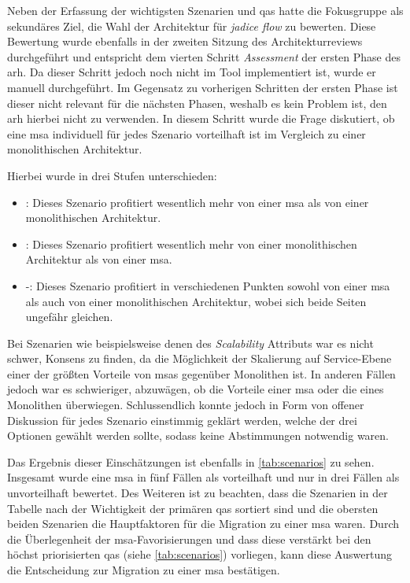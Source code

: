 Neben der Erfassung der wichtigsten Szenarien und \glspl{qa} hatte die Fokusgruppe als sekundäres Ziel, die Wahl der Architektur für \emph{jadice flow} zu bewerten.
Diese Bewertung wurde ebenfalls in der zweiten Sitzung des Architekturreviews durchgeführt und entspricht dem vierten Schritt \emph{Assessment} der ersten Phase des \gls{arh}.
Da dieser Schritt jedoch noch nicht im Tool implementiert ist, wurde er manuell durchgeführt.
Im Gegensatz zu vorherigen Schritten der ersten Phase ist dieser nicht relevant für die nächsten Phasen, weshalb es kein Problem ist, den \gls{arh} hierbei nicht zu verwenden.
In diesem Schritt wurde die Frage diskutiert, ob eine \acrlong{msa} individuell für jedes Szenario vorteilhaft ist im Vergleich zu einer monolithischen Architektur.

\newpage
Hierbei wurde in drei Stufen unterschieden:
\begin{itemize}
	\item \advantage\hspace*{0.1cm}: Dieses Szenario profitiert wesentlich mehr von einer \gls{msa} als von einer monolithischen Architektur.
	\item \disadvantage\hspace*{0.1cm}: Dieses Szenario profitiert wesentlich mehr von einer monolithischen Architektur als von einer \gls{msa}.
	\item \hspace*{0.27cm}-\hspace*{0.27cm}: Dieses Szenario profitiert in verschiedenen Punkten sowohl von einer \gls{msa} als auch von einer monolithischen Architektur, wobei sich beide Seiten ungefähr gleichen.
\end{itemize}
Bei Szenarien wie beispielsweise denen des \emph{Scalability} Attributs war es nicht schwer, Konsens zu finden, da die Möglichkeit der Skalierung auf Service-Ebene einer der größten Vorteile von \glspl{msa} gegenüber Monolithen ist.
In anderen Fällen jedoch war es schwieriger, abzuwägen, ob die Vorteile einer \gls{msa} oder die eines Monolithen überwiegen.
Schlussendlich konnte jedoch in Form von offener  Diskussion für jedes Szenario einstimmig geklärt werden, welche der drei Optionen gewählt werden sollte, sodass keine Abstimmungen notwendig waren.

Das Ergebnis dieser Einschätzungen ist ebenfalls in \cref{tab:scenarios} zu sehen.
Insgesamt wurde eine \gls{msa} in fünf Fällen als vorteilhaft und nur in drei Fällen als unvorteilhaft bewertet.
Des Weiteren ist zu beachten, dass die Szenarien in der Tabelle nach der Wichtigkeit der primären \glspl{qa} sortiert sind und die obersten beiden Szenarien die Hauptfaktoren für die Migration zu einer \acrlong{msa} waren.
Durch die Überlegenheit der \gls{msa}-Favorisierungen und dass diese verstärkt bei den höchst priorisierten \glspl{qa} (siehe \cref{tab:scenarios}) vorliegen, kann diese Auswertung die Entscheidung zur Migration zu einer \gls{msa} bestätigen.


